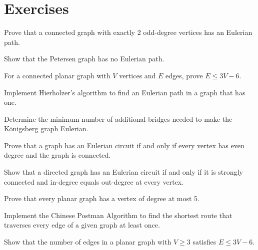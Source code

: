 \section{Exercises}

\begin{exercise}
Prove that a connected graph with exactly 2 odd-degree vertices has an Eulerian path.
\end{exercise}

\begin{exercise}
Show that the Petersen graph has no Eulerian path.
\end{exercise}

\begin{exercise}
For a connected planar graph with $V$ vertices and $E$ edges, prove $E \leq 3V - 6$.
\end{exercise}

\begin{exercise}[Computational]
Implement Hierholzer's algorithm to find an Eulerian path in a graph that has one.
\end{exercise}

\begin{exercise}
Determine the minimum number of additional bridges needed to make the K\"{o}nigsberg graph Eulerian.
\end{exercise}

\begin{exercise}
Prove that a graph has an Eulerian circuit if and only if every vertex has even degree and the graph is connected.
\end{exercise}

\begin{exercise}
Show that a directed graph has an Eulerian circuit if and only if it is strongly connected and in-degree equals out-degree at every vertex.
\end{exercise}

\begin{exercise}
Prove that every planar graph has a vertex of degree at most 5.
\end{exercise}

\begin{exercise}[Computational]
Implement the Chinese Postman Algorithm to find the shortest route that traverses every edge of a given graph at least once.
\end{exercise}

\begin{exercise}
Show that the number of edges in a planar graph with $V \geq 3$ satisfies $E \leq 3V - 6$.
\end{exercise}

